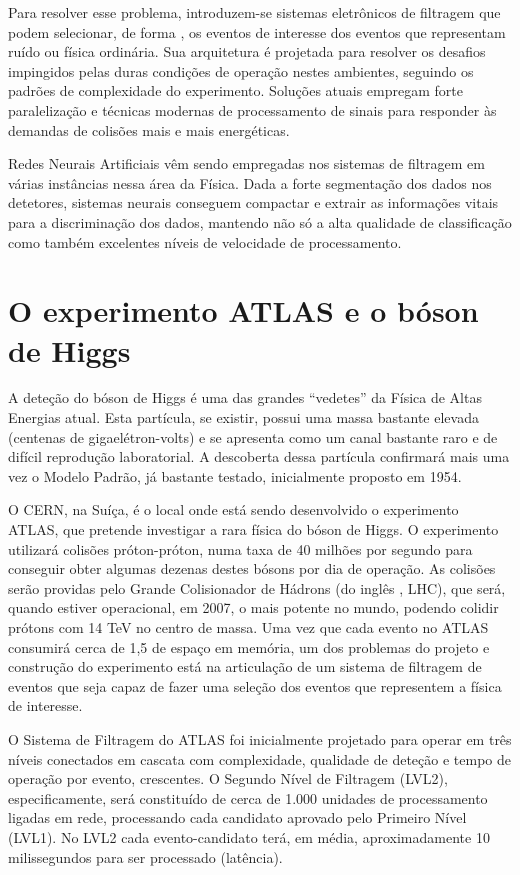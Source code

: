 Para resolver esse problema, introduzem-se sistemas eletrônicos de filtragem
que podem selecionar, de forma , os eventos de interesse dos
eventos que representam ruído ou física ordinária. Sua arquitetura é projetada
para resolver os desafios impingidos pelas duras condições de operação nestes
ambientes, seguindo os padrões de complexidade do experimento. Soluções atuais
empregam forte paralelização e técnicas modernas de processamento de sinais
para responder às demandas de colisões mais e mais energéticas.

Redes Neurais Artificiais vêm sendo empregadas nos sistemas de filtragem em
várias instâncias nessa área da Física. Dada a forte segmentação dos dados nos
detetores, sistemas neurais conseguem compactar e extrair as informações
vitais para a discriminação dos dados, mantendo não só a alta qualidade de
classificação como também excelentes níveis de velocidade de processamento.

\section{O experimento ATLAS e o bóson de Higgs}

A deteção do bóson de Higgs é uma das grandes ``vedetes'' da Física de Altas
Energias atual. Esta partícula, se existir, possui uma massa bastante elevada
(centenas de gigaelétron-volts) e se apresenta como um canal bastante raro e
de difícil reprodução laboratorial. A descoberta dessa partícula confirmará
mais uma vez o Modelo Padrão, já bastante testado, inicialmente proposto em
1954.

O CERN, na Suíça, é o local onde está sendo desenvolvido o experimento ATLAS,
que pretende investigar a rara física do bóson de Higgs. O experimento
utilizará colisões próton-próton, numa taxa de 40 milhões por segundo para
conseguir obter algumas dezenas destes bósons por dia de operação. As colisões
serão providas pelo Grande Colisionador de Hádrons (do inglês , LHC), que será, quando estiver operacional, em 2007, o mais
potente no mundo, podendo colidir prótons com 14 TeV no centro de massa. Uma
vez que cada evento no ATLAS consumirá cerca de 1,5  de espaço
em memória, um dos problemas do projeto e construção do experimento está na
articulação de um sistema de filtragem de eventos que seja capaz de fazer uma
seleção  dos eventos que representem a física de interesse.

O Sistema de Filtragem do ATLAS foi inicialmente projetado para
operar em três níveis conectados em cascata com complexidade, qualidade de
deteção e tempo de operação por evento, crescentes. O Segundo Nível de
Filtragem (LVL2), especificamente, será constituído de cerca de 1.000 unidades
de processamento ligadas em rede, processando cada candidato aprovado pelo
Primeiro Nível (LVL1). No LVL2 cada evento-candidato terá, em média,
aproximadamente 10 milissegundos para ser processado (latência).

